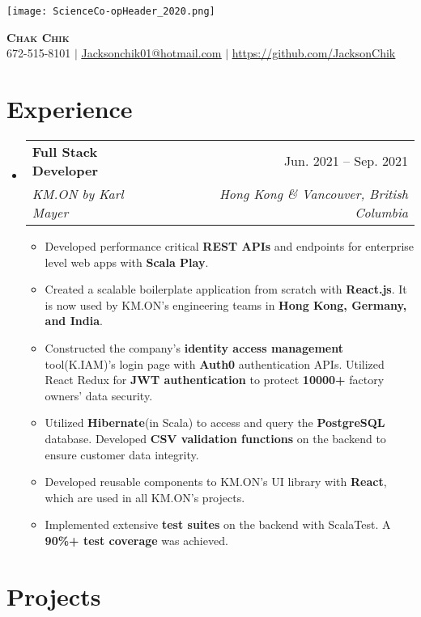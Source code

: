 \documentclass[letterpaper,11pt]{article}
\makeatletter
\newcommand{\resumeItem}[1]{
  \item\small{
    {#1 \vspace{-4pt}}
  }
}
\newcommand{\resumeSubheading}[4]{
  \vspace{-2pt}\item
    \begin{tabular*}{0.97\textwidth}[t]{l@{\extracolsep{\fill}}r}
      \textbf{#1} & #2 \\
      \textit{\small#3} & \textit{\small #4} \\
    \end{tabular*}\vspace{-7pt}
}
\newcommand{\resumeSubHeadingListStart}{\begin{itemize}[leftmargin=0.15in, label={}]}
\newcommand{\resumeSubHeadingListEnd}{\end{itemize}}
\newcommand{\resumeItemListStart}{\begin{itemize}}
\newcommand{\resumeItemListEnd}{\end{itemize}\vspace{-5pt}}
\makeatother
\begin{document}
  \texttt{[image: ScienceCo-opHeader\_2020.png]}

\begin{center}
    \textbf{\Huge \scshape Chak Chik} \\ \vspace{1pt}
    \small 672-515-8101 $|$ \href{mailto:x@x.com}{\underline{Jacksonchik01@hotmail.com}} $|$ 
    \href{https://github.com/...}{\underline{https://github.com/JacksonChik}}
\end{center}

\section{Experience}
  \resumeSubHeadingListStart


    \resumeSubheading
      {Full Stack Developer}{Jun. 2021 -- Sep. 2021}
      {KM.ON by Karl Mayer}{Hong Kong \& Vancouver, British Columbia}
      \resumeItemListStart
       
        \resumeItem{Developed performance critical \textbf{REST APIs} and endpoints for enterprise level web apps with \textbf{Scala Play}.} \resumeItem{Created a scalable boilerplate application from scratch with \textbf{React.js}. It is now used by KM.ON’s engineering teams in \textbf{Hong Kong, Germany, and India}.}
        \resumeItem{Constructed the company's \textbf{identity access management} tool(K.IAM)'s login page with \textbf{Auth0} authentication APIs. Utilized React Redux for \textbf{JWT authentication} to protect \textbf{10000+} factory owners' data security. }
        \resumeItem{Utilized \textbf{Hibernate}(in Scala) to access and query the \textbf{PostgreSQL} database. Developed \textbf{CSV validation functions} on the backend to ensure customer data integrity.}
        \resumeItem{Developed reusable components to KM.ON’s UI library with \textbf{React}, which are used in all KM.ON's projects.}
        \resumeItem{Implemented extensive \textbf{test suites} on the backend with ScalaTest. A \textbf{90\%+ test coverage} was achieved.}
          
        
    \resumeItemListEnd
    \resumeSubHeadingListEnd
\section{Projects}
    

    
    
\end{document}
